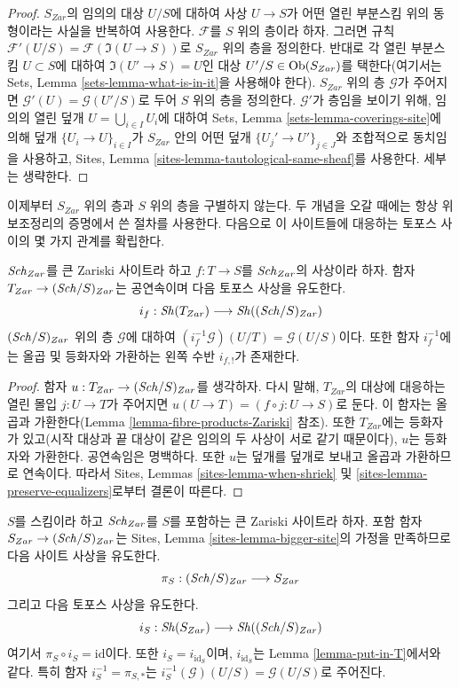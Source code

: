 \begin{proof}
$S_{Zar}$의 임의의 대상 $U/S$에 대하여 사상 $U \to S$가 어떤 열린
부분스킴 위의 동형이라는 사실을 반복하여 사용한다. $\mathcal{F}$를
$S$ 위의 층이라 하자. 그러면 규칙
$\mathcal{F}'(U/S) = \mathcal{F}(\Im(U \to S))$로 $S_{Zar}$ 위의 층을
정의한다. 반대로 각 열린 부분스킴 $U \subset S$에 대하여
$\Im(U' \to S) = U$인 대상 $U'/S \in \mathop{\mathrm{Ob}}\nolimits(S_{Zar})$를 택한다(여기서는
Sets, Lemma \ref{sets-lemma-what-is-in-it}을 사용해야 한다).
$S_{Zar}$ 위의 층 $\mathcal{G}$가 주어지면
$\mathcal{G}'(U) = \mathcal{G}(U'/S)$로 두어 $S$ 위의 층을 정의한다.
$\mathcal{G}'$가 층임을 보이기 위해, 임의의 열린 덮개
$U = \bigcup_{i \in I} U_i$에 대하여 Sets, Lemma
\ref{sets-lemma-coverings-site}에 의해 덮개
$\{U_i \to U\}_{i \in I}$가 $S_{Zar}$ 안의 어떤 덮개
$\{U_j' \to U'\}_{j \in J}$와 조합적으로 동치임을 사용하고, Sites,
Lemma \ref{sites-lemma-tautological-same-sheaf}를 사용한다. 세부는
생략한다.
\end{proof}

\noindent
이제부터 $S_{Zar}$ 위의 층과 $S$ 위의 층을 구별하지 않는다. 두 개념을
오갈 때에는 항상 위 보조정리의 증명에서 쓴 절차를 사용한다. 다음으로
이 사이트들에 대응하는 토포스 사이의 몇 가지 관계를 확립한다.

\begin{lemma}
\label{lemma-put-in-T}
$\mathit{Sch}_{Zar}$를 큰 Zariski 사이트라 하고
$f : T \to S$를 $\mathit{Sch}_{Zar}$의 사상이라 하자.
함자 $T_{Zar} \to (\mathit{Sch}/S)_{Zar}$는 공연속이며 다음 토포스 사상을
유도한다.
$$
i_f :
\mathop{\mathit{Sh}}\nolimits(T_{Zar})
\longrightarrow
\mathop{\mathit{Sh}}\nolimits((\mathit{Sch}/S)_{Zar})
$$
$(\mathit{Sch}/S)_{Zar}$ 위의 층 $\mathcal{G}$에 대하여
$(i_f^{-1}\mathcal{G})(U/T) = \mathcal{G}(U/S)$이다.
또한 함자 $i_f^{-1}$에는 올곱 및 등화자와 가환하는 왼쪽 수반
$i_{f, !}$가 존재한다.
\end{lemma}

\begin{proof}
함자 $u : T_{Zar} \to (\mathit{Sch}/S)_{Zar}$를 생각하자. 다시 말해,
$T_{Zar}$의 대상에 대응하는 열린 몰입 $j : U \to T$가 주어지면
$u(U \to T) = (f \circ j : U \to S)$로 둔다. 이 함자는 올곱과
가환한다(Lemma \ref{lemma-fibre-products-Zariski} 참조). 또한
$T_{Zar}$에는 등화자가 있고(시작 대상과 끝 대상이 같은 임의의 두
사상이 서로 같기 때문이다), $u$는 등화자와 가환한다. 공연속임은
명백하다. 또한 $u$는 덮개를 덮개로 보내고 올곱과
가환하므로 연속이다. 따라서 Sites, Lemmas
\ref{sites-lemma-when-shriek} 및
\ref{sites-lemma-preserve-equalizers}로부터 결론이 따른다.
\end{proof}

\begin{lemma}
\label{lemma-at-the-bottom}
$S$를 스킴이라 하고 $\mathit{Sch}_{Zar}$를 $S$를 포함하는 큰 Zariski
사이트라 하자. 포함 함자 $S_{Zar} \to (\mathit{Sch}/S)_{Zar}$는
Sites, Lemma \ref{sites-lemma-bigger-site}의 가정을 만족하므로
다음 사이트 사상을 유도한다.
$$
\pi_S : (\mathit{Sch}/S)_{Zar} \longrightarrow S_{Zar}
$$
그리고 다음 토포스 사상을 유도한다.
$$
i_S : \mathop{\mathit{Sh}}\nolimits(S_{Zar}) \longrightarrow \mathop{\mathit{Sh}}\nolimits((\mathit{Sch}/S)_{Zar})
$$
여기서 $\pi_S \circ i_S = \text{id}$이다. 또한
$i_S = i_{\text{id}_S}$이며, $i_{\text{id}_S}$는 Lemma
\ref{lemma-put-in-T}에서와 같다. 특히 함자
$i_S^{-1} = \pi_{S, *}$는
$i_S^{-1}(\mathcal{G})(U/S) = \mathcal{G}(U/S)$로 주어진다.
\end{lemma}

